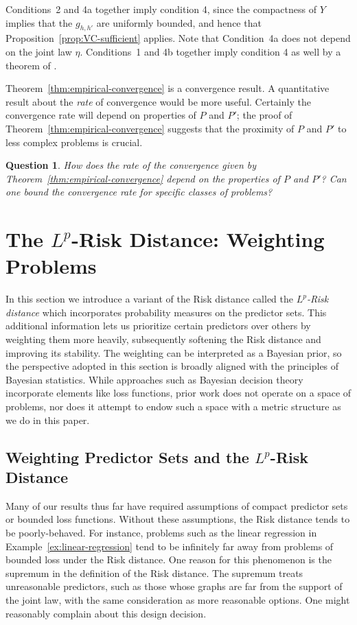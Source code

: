 \documentclass[twoside,11pt]{article}
\newtheorem{question}[theorem]{Question}
\begin{document}
    Conditions~2 and 4a together imply condition 4, since the compactness of $Y$ implies that the $g_{h,h'}$ are uniformly bounded, and hence that Proposition~\ref{prop:VC-sufficient} applies. Note that Condition~4a does not depend on the joint law $\eta$. Conditions~1 and 4b together imply condition 4 as well by a theorem of \citet{gaenssler_1975}.

    Theorem~\ref{thm:empirical-convergence} is a convergence result. A quantitative result about the \emph{rate} of convergence would be more useful. Certainly the convergence rate will depend on properties of $P$ and $P'$; the proof of Theorem~\ref{thm:empirical-convergence} suggests that the proximity of $P$ and $P'$ to less complex problems is crucial.

    \begin{question}\label{q:conv-thm}
        How does the rate of the convergence given by Theorem~\ref{thm:empirical-convergence} depend on the properties of $P$ and $P'$? Can one bound the convergence rate for specific classes of problems?
    \end{question}


\section{The $L^p$-Risk Distance: Weighting Problems}\label{sec:probabilistic}

In this section we introduce a variant of the Risk distance called the \emph{$L^p$-Risk distance} which incorporates probability measures on the predictor sets. This additional information lets us prioritize certain predictors over others by weighting them more heavily, subsequently softening the Risk distance and improving its stability. The weighting can be interpreted as a Bayesian prior, so the perspective adopted in this section is broadly aligned with the principles of Bayesian statistics. While approaches such as Bayesian decision theory \citep{berger1985statistical} incorporate elements like loss functions, prior work does not operate on a space of problems, nor does it attempt to endow such a space with a metric structure as we do in this paper.

\subsection{Weighting Predictor Sets and the $L^p$-Risk Distance}



Many of our results thus far have required assumptions of compact predictor sets or bounded loss functions.
Without these assumptions, the Risk distance tends to be poorly-behaved.
For instance, problems such as the linear regression in Example~\ref{ex:linear-regression} tend to be infinitely far away from problems of bounded loss under the Risk distance.
One reason for this phenomenon is the supremum in the definition of the Risk distance.
The supremum treats unreasonable predictors, such as those whose graphs are far from the support of the joint law, with the same consideration as more reasonable options.
One might reasonably complain about this design decision.
\end{document}
